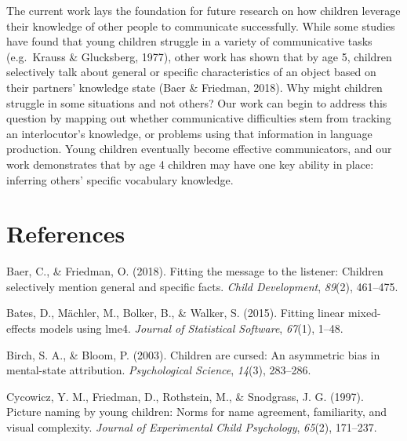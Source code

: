 \documentclass[10pt, letterpaper]{article}
\begin{document}
The current work lays the foundation for future research on how children
leverage their knowledge of other people to communicate successfully.
While some studies have found that young children struggle in a variety
of communicative tasks (e.g.~Krauss \& Glucksberg, 1977), other work has
shown that by age 5, children selectively talk about general or specific
characteristics of an object based on their partners' knowledge state
(Baer \& Friedman, 2018). Why might children struggle in some situations
and not others? Our work can begin to address this question by mapping
out whether communicative difficulties stem from tracking an
interlocutor's knowledge, or problems using that information in language
production. Young children eventually become effective communicators,
and our work demonstrates that by age 4 children may have one key
ability in place: inferring others' specific vocabulary knowledge.

\vspace{1em} 

\hypertarget{references}{%
\section{References}\label{references}}

\setlength{\parindent}{-0.1in} 
\setlength{\leftskip}{0.125in}

\noindent

\hypertarget{refs}{}
\leavevmode\hypertarget{ref-baer2018}{}%
Baer, C., \& Friedman, O. (2018). Fitting the message to the listener:
Children selectively mention general and specific facts. \emph{Child
Development}, \emph{89}(2), 461--475.

\leavevmode\hypertarget{ref-bates2015}{}%
Bates, D., Mächler, M., Bolker, B., \& Walker, S. (2015). Fitting linear
mixed-effects models using lme4. \emph{Journal of Statistical Software},
\emph{67}(1), 1--48.

\leavevmode\hypertarget{ref-birch2003}{}%
Birch, S. A., \& Bloom, P. (2003). Children are cursed: An asymmetric
bias in mental-state attribution. \emph{Psychological Science},
\emph{14}(3), 283--286.

\leavevmode\hypertarget{ref-cycowicz1997}{}%
Cycowicz, Y. M., Friedman, D., Rothstein, M., \& Snodgrass, J. G.
(1997). Picture naming by young children: Norms for name agreement,
familiarity, and visual complexity. \emph{Journal of Experimental Child
Psychology}, \emph{65}(2), 171--237.
\end{document}
